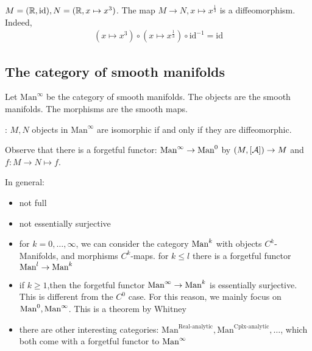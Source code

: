 \begin{example}
    \(M=(\mathbb{R},\text{id}),N=(\mathbb{R},x\mapsto x^3)\). The map \(M\to N, x\mapsto x^{\frac{1}{3}}\)
    is a diffeomorphism. Indeed, 
    \begin{align*}
        (x\mapsto x^3)\circ (x\mapsto x^{\frac{1}{3}}) \circ\text{id}^{-1}=\text{id}
    \end{align*}
\end{example}

\subsection{The category of smooth manifolds}

\begin{definition*}
    Let \(\text{Man}^\infty\) be the category of smooth manifolds. The objects are the smooth manifolds. 
    The morphisms are the smooth maps.
\end{definition*}

: \(M,N\) objects in \(\text{Man}^\infty\) are isomorphic if and only if they are diffeomorphic.

Observe that there is a forgetful functor: \(\maninf\to\man0\) by \( (M,[\mathcal{A}])\to M\) and \(f:M\to N\mapsto f\).

In general:\begin{itemize}
    \item not full 
    \item not essentially surjective
\end{itemize}

\begin{remark}
    \begin{itemize}
        \item for \(k=0,\dots,\infty\), we can consider the category \(\text{Man}^k\) with objects \(C^k\)-Manifolds, and morphisms \(C^k\)-maps. 
              for \(k\leq l\) there is a forgetful functor \(\text{Man}^l\to\text{Man}^k\)
        \item if \(k\geq 1\),then the forgetful functor \(\text{Man}^\infty\to\text{Man}^k\) is essentially surjective. This is different from the \(C^0\) case. For this reason, we mainly focus on \(\man0,\maninf\). This is a theorem by Whitney
        \item there are other interesting categories: \(\text{Man}^{\text{Real-analytic}},\text{Man}^{\text{Cplx-analytic}},\dots\), which both come with a forgetful functor to \(\text{Man}^\infty\)
    \end{itemize}
\end{remark}

